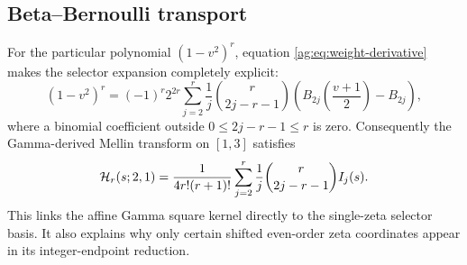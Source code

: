 \documentclass[11pt,letterpaper]{article}
\numberwithin{equation}{section}
\theoremstyle{definition}\newtheorem{definition}[theorem]{Definition}
\theoremstyle{remark}\newtheorem{remark}[theorem]{Remark}
\begin{document}
\subsection{Beta--Bernoulli transport}
For the particular polynomial $(1-v^2)^r$, equation
\eqref{ag:eq:weight-derivative} makes the selector expansion completely
explicit:
\begin{equation}\label{ag:eq:beta-Bernoulli}
 (1-v^2)^r=(-1)^r2^{2r}\sum_{j=2}^{r}
       \frac1j\binom r{2j-r-1}
       \left(B_{2j}\left(\frac{v+1}{2}\right)-B_{2j}\right),
\end{equation}
where a binomial coefficient outside $0\le2j-r-1\le r$ is zero.
Consequently the Gamma-derived Mellin transform on $[1,3]$ satisfies
\begin{equation}\label{ag:eq:H-selector-transport}
 \mathcal H_r(s;2,1)=\frac1{4r!(r+1)!}
                 \sum_{j=2}^{r}\frac1j\binom r{2j-r-1}I_j(s).
\end{equation}
This links the affine Gamma square kernel directly to the single-zeta
selector basis. It also explains why only certain shifted even-order
zeta coordinates appear in its integer-endpoint reduction.
\end{document}
